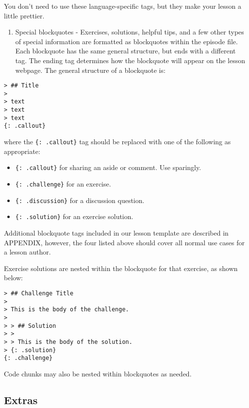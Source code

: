 \documentclass[
]{book}
\providecommand{\tightlist}{%
  \setlength{\itemsep}{0pt}\setlength{\parskip}{0pt}}
\begin{document}
You don't need to use these language-specific tags, but they make your lesson a little prettier.

\begin{enumerate}
\def\labelenumi{\arabic{enumi}.}
\tightlist
\item
  Special blockquotes - Exercises, solutions, helpful tips, and a few other types of special information are
  formatted as blockquotes within the episode file. Each blockquote has the same general structure, but ends
  with a different tag. The ending tag determines how the blockquote will appear on the lesson webpage. The
  general structure of a blockquote is:
\end{enumerate}

\begin{verbatim}
> ## Title
>
> text
> text
> text
{: .callout}
\end{verbatim}

where the \texttt{\{:\ .callout\}} tag should be replaced with one of the following as appropriate:

\begin{itemize}
\tightlist
\item
  \texttt{\{:\ .callout\}} for sharing an aside or comment. Use sparingly.
\item
  \texttt{\{:\ .challenge\}} for an exercise.
\item
  \texttt{\{:\ .discussion\}} for a discussion question.
\item
  \texttt{\{:\ .solution\}} for an exercise solution.
\end{itemize}

Additional blockquote tags included in our lesson template are described in APPENDIX, however, the four listed
above should cover all normal use cases for a lesson author.

Exercise solutions are nested within the blockquote for that exercise, as shown below:

\begin{verbatim}
> ## Challenge Title
>
> This is the body of the challenge.
>
> > ## Solution
> >
> > This is the body of the solution.
> {: .solution}
{: .challenge}
\end{verbatim}

Code chunks may also be nested within blockquotes as needed.

\hypertarget{extras}{%
\subsection{Extras}\label{extras}}
\end{document}
